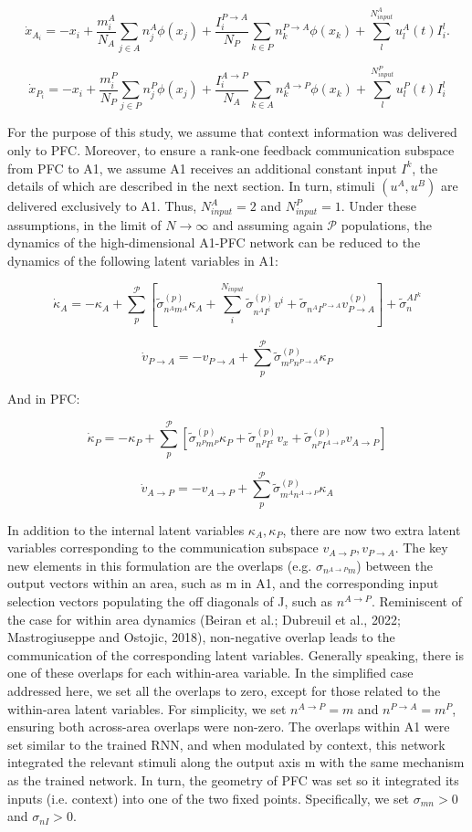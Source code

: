 \documentclass[12pt]{article}
\begin{document}
$$ \dot x_{A_i} = -x_i + \frac{m^A_i}{N_A}\sum_{j\in A}n^A_j \phi(x_j) + \frac{ I^{P\to A}_i}{N_P}\sum_{k\in P} n^{P\to A}_k \phi(x_k) + \sum_l^{N^A_{input}}u^A_l(t)I^l_i.  $$

$$ \dot x_{P_i}  = -x_i + \frac{m^P_i}{N_P}\sum_{j\in P}n^P_j \phi(x_j) + \frac{ I^{A\to P}_i}{N_A}\sum_{k\in A} n^{A\to P}_k \phi(x_k) + \sum_l^{N^P_{input}}u^P_l(t)I^l_i $$

For the purpose of this study, we assume that context information was delivered only to PFC. Moreover, to ensure a rank-one feedback communication subspace from PFC to A1, we assume A1 receives an additional constant input $I^k$, the details of which are described in the next section. In turn, stimuli $(u^A, u^B)$  are delivered exclusively to A1. Thus, $N^A_{input} = 2 $ and $N^P_{input} = 1$. Under these assumptions, in the limit of $N \to \infty$ and assuming again $\mathcal{P}$ populations, the dynamics of the high-dimensional A1-PFC network can be reduced to the dynamics of the following latent variables in A1:

$$\dot \kappa_A = -\kappa_A +  \sum_p^{\mathcal{P}} \left[ \tilde \sigma_{n^Am^A}^{(p)} \kappa_A + \sum_i^{N_{input}} \tilde{\sigma}_{n^AI^i} ^{(p)} v^i  +\tilde\sigma_{n^AI^{P\to A}} v_{P\to A}^{(p)} \right] + \tilde{\sigma}_n^{AI^k}$$

$$\dot v_{P \to A} = -v_{P \to A}   + \sum_p^{\mathcal{P}} \tilde\sigma_{m^Pn^{P \to A}}^{(p)} \kappa_P$$

And in PFC:

$$\dot \kappa_P = -\kappa_P +  \sum_p^{\mathcal{P}} \left[ \tilde \sigma_{n^Pm^P}^{(p)} \kappa_P + \tilde\sigma_{n^PI^{x}}^{(p)} v_{x} + \tilde\sigma_{n^PI^{A\to P}}^{(p)} v_{A\to P}\right]$$

$$\dot v_{A \to P} = -v_{A \to P}   + \sum_p^{\mathcal{P}} \tilde\sigma_{m^An^{A \to P}}^{(p)} \kappa_A$$

In addition to the internal latent variables $\kappa_A,\kappa_P$, there are now two extra latent variables corresponding to the communication subspace $v_{A \to P},v_{P \to A}$. The key new elements in this formulation are the overlaps (e.g. $\sigma_{n^{A \to P}m}$) between the output vectors within an area, such as m in A1, and the corresponding input selection vectors populating the off diagonals of J, such as $n^{A \to P}$. Reminiscent of the case for within area dynamics (Beiran et al.; Dubreuil et al., 2022; Mastrogiuseppe and Ostojic, 2018), non-negative overlap leads to the communication of the corresponding latent variables. Generally speaking, there is one of these overlaps for each within-area variable. In the simplified case addressed here, we set all the overlaps to zero, except for those related to the within-area latent variables. For simplicity, we set $n^{A \to P} = m$ and $n^{P \to A} = m ^P$, ensuring both across-area overlaps were non-zero. The overlaps within A1 were set similar to the trained RNN, and when modulated by context, this network integrated the relevant stimuli along the output axis m with the same mechanism as the trained network. In turn, the geometry of PFC was set so it integrated its inputs (i.e. context) into one of the two fixed points. Specifically, we set $\sigma_{mn} > 0$ and $\sigma_{nI} > 0$. 
\end{document}
